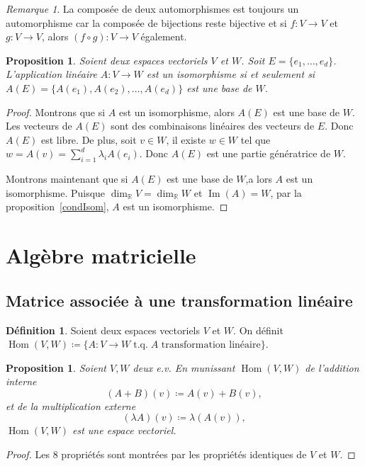 \documentclass{article}
\DeclareMathOperator{\tq}{\text{ t.q. }}
\DeclareMathOperator{\Imf}{Im}
\DeclareMathOperator{\Hom}{Hom}
\newcommand{\R}{\mathbb R}
\newtheorem{prp}[thm]{Proposition}
\theoremstyle{definition}
\newtheorem{déf}[thm]{Définition}
\theoremstyle{remark}
\newtheorem*{rmq}{Remarque}
\begin{document}
		\begin{rmq} La composée de deux automorphismes est toujours un automorphisme car la composée de bijections reste bijective et si $f : V \to V$ et $g : V \to V$,
		alors $(f \circ g) : V \to V$ également. \end{rmq}

		\begin{prp} Soient deux espaces vectoriels $V$ et $W$. Soit $E = \{e_1, \dotsc, e_d\}$. L'application linéaire $A : V \to W$ est un isomorphisme si et
		seulement si $A(E) = \{A(e_1), A(e_2), \dotsc, A(e_d)\}$ est une base de $W$. \end{prp}

		\begin{proof} Montrons que si $A$ est un isomorphisme, alors $A(E)$ est une base de $W$. Les vecteurs de $A(E)$ sont des combinaisons linéaires des vecteurs
		de $E$. Donc $A(E)$ est libre. De plus, soit $v \in W$, il existe $w \in W$ tel que $w = A(v) = \sum_{i=1}^d\lambda_iA(e_i)$. Donc $A(E)$ est une partie
		génératrice de $W$.

		Montrons maintenant que si $A(E)$ est une base de $W$,a lors $A$ est un isomorphisme. Puisque $\dim_\R V = \dim_\R W$ et $\Imf(A) = W$, par la
		proposition~\ref{condIsom}, $A$ est un isomorphisme. \end{proof}

\newpage
\section{Algèbre matricielle}
	\subsection{Matrice associée à une transformation linéaire}
		\begin{déf} Soient deux espaces vectoriels $V$ et $W$. On définit $\Hom(V, W) \coloneqq \{A : V \to W \tq A \text { transformation linéaire}\}$. \end{déf}

		\begin{prp} Soient $V, W$ deux e.v. En munissant $\Hom(V, W)$ de l'addition interne \[(A+B)(v) \coloneqq A(v) + B(v),\] et de la multiplication externe
		\[(\lambda A)(v) \coloneqq \lambda(A(v)),\] $\Hom(V, W)$ est une espace vectoriel. \end{prp}

		\begin{proof} Les 8 propriétés sont montrées par les propriétés identiques de $V$ et $W$. \end{proof}
\end{document}
